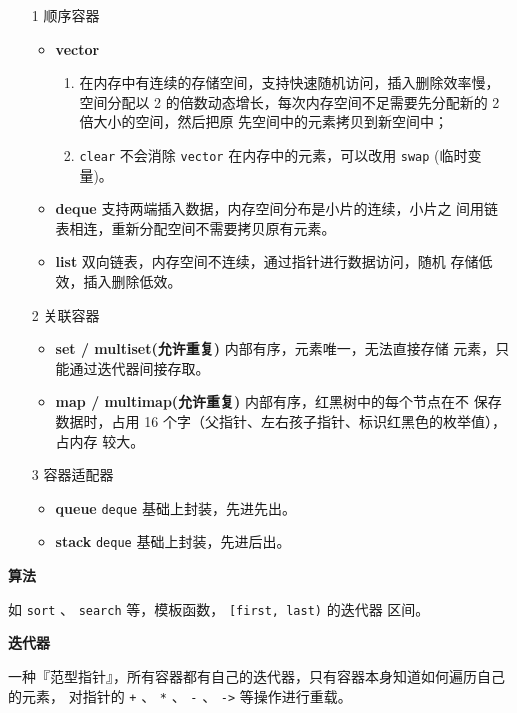 \begin{itemize}
\item [1] 顺序容器
  \begin{itemize}
  \item \textbf{\ttfamily vector}
    \begin{enumerate}
    \item 在内存中有连续的存储空间，支持快速随机访问，插入删除效率慢，空间分配以
      2 的倍数动态增长，每次内存空间不足需要先分配新的 2 倍大小的空间，然后把原
      先空间中的元素拷贝到新空间中；
    \item \verb|clear| 不会消除 \verb|vector| 在内存中的元素，可以改用
      \verb|swap| (临时变量)。
    \end{enumerate}
  \item \textbf{\ttfamily deque} \quad 支持两端插入数据，内存空间分布是小片的连续，小片之
    间用链表相连，重新分配空间不需要拷贝原有元素。
  \item \textbf{\ttfamily list} \quad 双向链表，内存空间不连续，通过指针进行数据访问，随机
    存储低效，插入删除低效。
  \end{itemize}
\item [2] 关联容器
  \begin{itemize}
  \item \textbf{\ttfamily set / multiset(允许重复)} \quad 内部有序，元素唯一，无法直接存储
    元素，只能通过迭代器间接存取。
  \item \textbf{\ttfamily map / multimap(允许重复)} \quad 内部有序，红黑树中的每个节点在不
    保存数据时，占用 16 个字（父指针、左右孩子指针、标识红黑色的枚举值），占内存
    较大。
  \end{itemize}
\item [3] 容器适配器
  \begin{itemize}
  \item \textbf{\ttfamily queue} \quad \verb|deque| 基础上封装，先进先出。
  \item \textbf{\ttfamily stack} \quad \verb|deque| 基础上封装，先进后出。
  \end{itemize}
\end{itemize}

\noindent\textbf{算法}

如 \verb|sort| 、 \verb|search| 等，模板函数， \verb|[first, last)| 的迭代器
区间。

\noindent\textbf{迭代器}

一种『范型指针』，所有容器都有自己的迭代器，只有容器本身知道如何遍历自己的元素，
对指针的 \verb|+| 、 \verb|*| 、 \verb|-| 、 \verb|->| 等操作进行重载。

